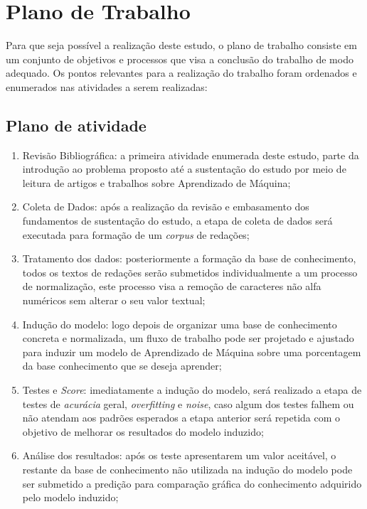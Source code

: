 \chapter{Plano de Trabalho}\label{plano}

Para que seja possível a realização deste estudo, o plano de trabalho consiste em um conjunto de objetivos e processos que visa a conclusão do trabalho de modo adequado. Os pontos relevantes para a realização do trabalho foram ordenados e enumerados nas atividades a serem realizadas:

\section{Plano de atividade}

\begin{enumerate}
\item Revisão Bibliográfica: a primeira atividade enumerada deste estudo, parte da introdução ao problema proposto até a sustentação do estudo por meio de leitura de artigos e trabalhos sobre Aprendizado de Máquina;

\item Coleta de Dados: após a realização da revisão e embasamento dos fundamentos de sustentação do estudo,
a etapa de coleta de dados será executada para formação de um \textit{corpus} de redações;

\item Tratamento dos dados: posteriormente a formação da base de conhecimento, todos os textos de redações serão submetidos individualmente a um processo de normalização, este processo visa a remoção de caracteres não alfa numéricos sem alterar o seu valor textual; 

\item Indução do modelo: logo depois de organizar uma base de conhecimento concreta e normalizada, um fluxo de trabalho pode ser projetado e ajustado para induzir um modelo de Aprendizado de Máquina sobre uma porcentagem da base conhecimento que se deseja aprender;

\item Testes e \textit{Score}: imediatamente a indução do modelo, será realizado a etapa de testes de \textit{acurácia} geral, \textit{overfitting} e \textit{noise}, caso algum dos testes falhem ou não atendam aos padrões esperados a etapa anterior será repetida com o objetivo de melhorar os resultados do modelo induzido;

\item Análise dos resultados: após os teste apresentarem um valor aceitável, o restante da base de conhecimento não utilizada na indução do modelo pode ser submetido a predição para comparação gráfica do conhecimento adquirido pelo modelo induzido;


\end{enumerate}
